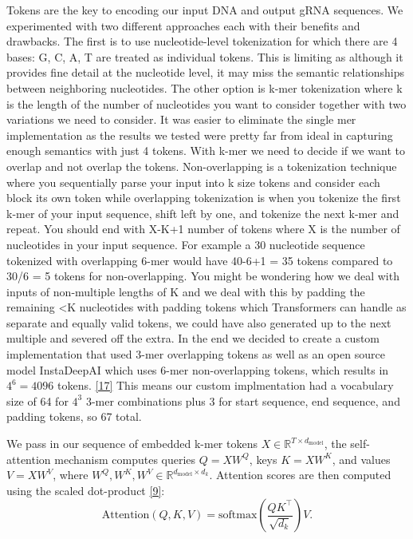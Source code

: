 \documentclass{article}
\begin{document}
Tokens are the key to encoding our input DNA and output gRNA sequences. We experimented with two different approaches each with their benefits and drawbacks. The first is to use nucleotide-level tokenization for which there are 4 bases: G, C, A, T are treated as individual tokens. This is limiting as although it provides fine detail at the nucleotide level, it may miss the semantic relationships between neighboring nucleotides. The other option is k-mer tokenization where k is the length of the number of nucleotides you want to consider together with two variations we need to consider. It was easier to eliminate the single mer implementation as the results we tested were pretty far from ideal in capturing enough semantics with just 4 tokens. With k-mer we need to decide if we want to overlap and not overlap the tokens. Non-overlapping is a tokenization technique where you sequentially parse your input into k size tokens and consider each block its own token while overlapping tokenization is when you tokenize the first k-mer of your input sequence, shift left by one, and tokenize the next k-mer and repeat. You should end with X-K+1 number of tokens where X is the number of nucleotides in your input sequence. For example a 30 nucleotide sequence tokenized with overlapping 6-mer would have 40-6+1 = 35 tokens compared to 30/6 = 5 tokens for non-overlapping. You might be wondering how we deal with inputs of non-multiple lengths of K and we deal with this by padding the remaining <K nucleotides with padding tokens which Transformers can handle as separate and equally valid tokens, we could have also generated up to the next multiple and severed off the extra. In the end we decided to create a custom implementation that used 3-mer overlapping tokens as well as an open source model InstaDeepAI which uses 6-mer non-overlapping tokens, which results in $4^6 = 4096$ tokens. \hyperref[Reference 17]{[17]} This means our custom implmentation had a vocabulary size of 64 for $4^3$ 3-mer combinations plus 3 for start sequence, end sequence, and padding tokens, so 67 total. 

We pass in our sequence of embedded k-mer tokens $X \in \mathbb{R}^{T \times d_{\text{model}}}$, the self-attention mechanism computes queries $Q = XW^Q$, keys $K = XW^K$, and values $V = XW^V$, where $W^Q, W^K, W^V \in \mathbb{R}^{d_{\text{model}} \times d_k}$. Attention scores are then computed using the scaled dot-product \hyperref[Reference 9]{[9]}: 
\[
\text{Attention}(Q, K, V) = \text{softmax}\left( \frac{QK^\top}{\sqrt{d_k}} \right)V.
\]
\end{document}
